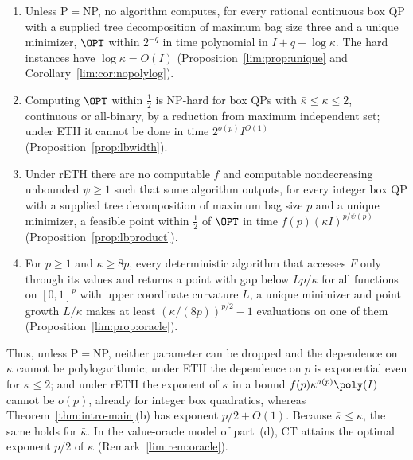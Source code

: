 \begin{theorem}\label{thm:intro-lower}
\leavevmode
\begin{enumerate}[label=(\alph*)]
\item Unless P${}={}$NP, no algorithm computes, for every rational continuous
box QP with a supplied tree decomposition of maximum bag size three and a
unique minimizer, $\OPT$ within $2^{-q}$ in time polynomial in
$I+q+\log\kappa$. The hard instances have $\log\kappa=O(I)$
(Proposition~\ref{lim:prop:unique} and Corollary~\ref{lim:cor:nopolylog}).
\item Computing $\OPT$ within $\frac12$ is NP-hard for box QPs with
$\bar\kappa\le\kappa\le2$, continuous or all-binary, by a reduction from
maximum independent set; under ETH it cannot be done in time
$2^{o(p)}I^{O(1)}$ (Proposition~\ref{prop:lbwidth}).
\item Under rETH there are no computable $f$ and computable nondecreasing
unbounded $\psi\ge1$ such that some algorithm outputs, for every integer box QP
with a supplied tree decomposition of maximum bag size $p$ and a unique
minimizer, a feasible point
within $\frac12$ of $\OPT$ in time $f(p)(\kappa I)^{p/\psi(p)}$
(Proposition~\ref{prop:lbproduct}).
\item For $p\ge1$ and $\kappa\ge8p$, every deterministic algorithm that
accesses $F$ only through its values and returns a point with gap below
$Lp/\kappa$ for all functions on $[0,1]^p$ with upper coordinate curvature $L$, a
unique minimizer and point growth $L/\kappa$ makes at least
$(\kappa/(8p))^{p/2}-1$ evaluations on one of them
(Proposition~\ref{lim:prop:oracle}).
\end{enumerate}
\end{theorem}

Thus, unless P${}={}$NP, neither parameter can be dropped and the dependence
on $\kappa$ cannot be polylogarithmic; under ETH the dependence on $p$ is
exponential even for $\kappa\le2$; and under rETH the exponent of $\kappa$ in
a bound $f(p)\kappa^{a(p)}\poly(I)$ cannot be $o(p)$, already for integer box
quadratics, whereas Theorem~\ref{thm:intro-main}(b) has exponent $p/2+O(1)$.
Because $\bar\kappa\le\kappa$, the same holds for $\bar\kappa$. In the
value-oracle model of part~(d), CT attains the optimal exponent $p/2$ of
$\kappa$ (Remark~\ref{lim:rem:oracle}).

